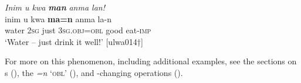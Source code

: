 \ea%
    \label{ex:adj:26}
         \textit{Inim u kwa} \textbf{\textit{man}} \textit{anma lan!}\\
\gll    inim  u    kwa  \textbf{ma=n}      anma  la-n\\
    water  \textsc{2sg}  just    3\textsc{sg.obj=obl}  good  eat-\textsc{imp}\\
\glt `Water – just drink it well!’ [ulwa014†]
\z

For more on this phenomenon, including additional examples, see the sections on s (), the  \textit{=n} ‘\textsc{obl}’ (), and -changing operations ().

